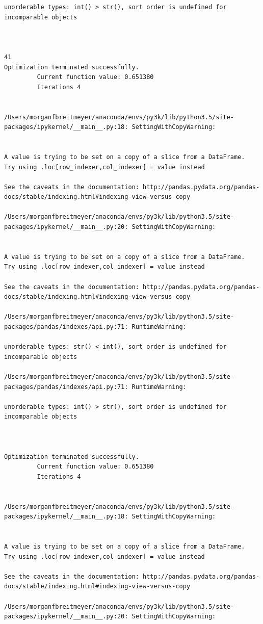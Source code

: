 \begin{lstlisting}
unorderable types: int() > str(), sort order is undefined for incomparable objects



41
Optimization terminated successfully.
         Current function value: 0.651380
         Iterations 4


/Users/morganfbreitmeyer/anaconda/envs/py3k/lib/python3.5/site-packages/ipykernel/__main__.py:18: SettingWithCopyWarning:


A value is trying to be set on a copy of a slice from a DataFrame.
Try using .loc[row_indexer,col_indexer] = value instead

See the caveats in the documentation: http://pandas.pydata.org/pandas-docs/stable/indexing.html#indexing-view-versus-copy

/Users/morganfbreitmeyer/anaconda/envs/py3k/lib/python3.5/site-packages/ipykernel/__main__.py:20: SettingWithCopyWarning:


A value is trying to be set on a copy of a slice from a DataFrame.
Try using .loc[row_indexer,col_indexer] = value instead

See the caveats in the documentation: http://pandas.pydata.org/pandas-docs/stable/indexing.html#indexing-view-versus-copy

/Users/morganfbreitmeyer/anaconda/envs/py3k/lib/python3.5/site-packages/pandas/indexes/api.py:71: RuntimeWarning:

unorderable types: str() < int(), sort order is undefined for incomparable objects

/Users/morganfbreitmeyer/anaconda/envs/py3k/lib/python3.5/site-packages/pandas/indexes/api.py:71: RuntimeWarning:

unorderable types: int() > str(), sort order is undefined for incomparable objects



Optimization terminated successfully.
         Current function value: 0.651380
         Iterations 4


/Users/morganfbreitmeyer/anaconda/envs/py3k/lib/python3.5/site-packages/ipykernel/__main__.py:18: SettingWithCopyWarning:


A value is trying to be set on a copy of a slice from a DataFrame.
Try using .loc[row_indexer,col_indexer] = value instead

See the caveats in the documentation: http://pandas.pydata.org/pandas-docs/stable/indexing.html#indexing-view-versus-copy

/Users/morganfbreitmeyer/anaconda/envs/py3k/lib/python3.5/site-packages/ipykernel/__main__.py:20: SettingWithCopyWarning:



\end{lstlisting}
